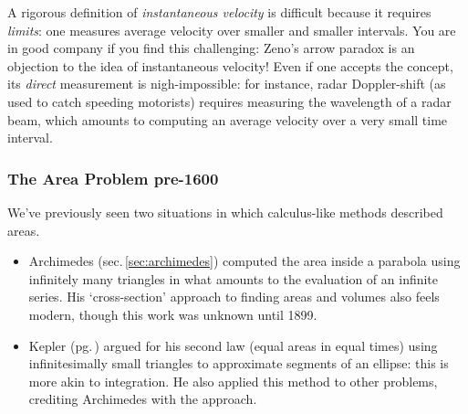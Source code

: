 A rigorous definition of \emph{instantaneous velocity} is difficult because it requires \emph{limits}: one measures average velocity over smaller and smaller intervals. You are in good company if you find this challenging: Zeno's arrow paradox is an objection to the idea of instantaneous velocity! Even if one accepts the concept, its \emph{direct} measurement is nigh-impossible:	for instance, radar Doppler-shift (as used to catch speeding motorists) requires measuring the wavelength of a radar beam, which amounts to computing an average velocity over a very small time interval. %



\subsubsection*{The Area Problem pre-1600}

We've previously seen two situations in which calculus-like methods described areas.
\begin{itemize}
  \item Archimedes (sec.\,\ref{sec:archimedes}) computed the area inside a parabola using infinitely many triangles in what amounts to the evaluation of an infinite series. His `cross-section' approach to finding areas and volumes also feels modern, though this work was unknown until 1899.
  \item Kepler (pg.\,\pageref{pg:kepler2}) argued for his second law (equal areas in equal times) using infinitesimally small triangles to approximate segments of an ellipse: this is more akin to integration. He also applied this method to other problems, crediting Archimedes with the approach.
\end{itemize}

